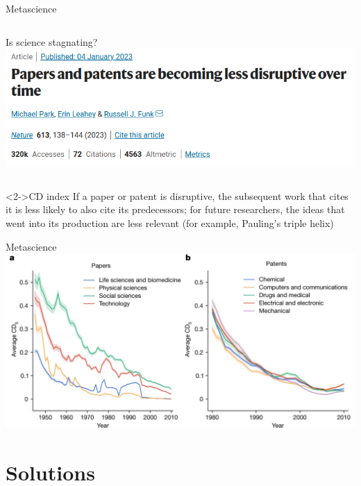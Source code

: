\documentclass{beamer}
\begin{document}
\begin{frame}{Metascience}

	\begin{columns}
		Is science stagnating?
		\includegraphics[width=1\textwidth]{../images/stagnant.png}
	\end{columns}
	
	\begin{block}<2->{CD index}
		If a paper or patent is disruptive, the subsequent work that cites it is less likely to also cite its predecessors; for future researchers, the ideas that went into its production are less relevant (for example, Pauling's triple helix)
	\end{block}

	
\end{frame}

\begin{frame}{Metascience}
	\includegraphics[width=1\textwidth]{../images/paperspatents.png}
\end{frame}


\section{Solutions}
\end{document}
